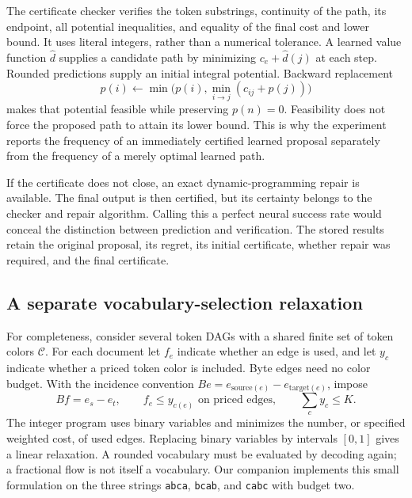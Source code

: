 The certificate checker verifies the token substrings, continuity of the
path, its endpoint, all potential inequalities, and equality of the final
cost and lower bound. It uses literal integers, rather than a numerical
tolerance. A learned value function $\widehat d$ supplies a candidate path
by minimizing $c_e+\widehat d(j)$ at each step. Rounded predictions supply
an initial integral potential. Backward replacement
\[
 p(i)\leftarrow\min\bigl(p(i),\min_{i\to j}(c_{ij}+p(j))\bigr)
\]
makes that potential feasible while preserving $p(n)=0$. Feasibility does
not force the proposed path to attain its lower bound. This is why the
experiment reports the frequency of an immediately certified learned
proposal separately from the frequency of a merely optimal learned path.

If the certificate does not close, an exact dynamic-programming repair is
available. The final output is then certified, but its certainty belongs
to the checker and repair algorithm. Calling this a perfect neural success
rate would conceal the distinction between prediction and verification.
The stored results retain the original proposal, its regret, its initial
certificate, whether repair was required, and the final certificate.

\subsection{A separate vocabulary-selection relaxation}

For completeness, consider several token DAGs with a shared finite set of
token colors $\mathcal C$. For each document let $f_e$ indicate whether an
edge is used, and let $y_c$ indicate whether a priced token color is included.
Byte edges need no color budget. With the incidence convention
$B e=e_{\mathrm{source}(e)}-e_{\mathrm{target}(e)}$, impose
\[
 Bf=e_s-e_t,\qquad f_e\leq y_{c(e)}\text{ on priced edges},\qquad
 \sum_c y_c\leq K.
\]
The integer program uses binary variables and minimizes the number, or
specified weighted cost, of used edges. Replacing binary variables by
intervals $[0,1]$ gives a linear relaxation. A rounded vocabulary must be
evaluated by decoding again; a fractional flow is not itself a vocabulary.
Our companion implements this small formulation on the three strings
\texttt{abca}, \texttt{bcab}, and \texttt{cabc} with budget two.

